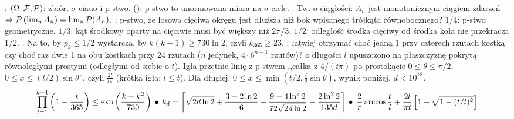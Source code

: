 :  $(\Omega, \mathcal F, \operatorname{\mathcal{P}})$: zbiór, $\sigma$-ciauo i p-stwo.
 (): p-stwo to unormowana miara na $\sigma$-ciele.
.
Tw. o ciągłości: $A_n$ jest monotonicznym ciągiem zdarzeń $\Rightarrow \operatorname{\mathcal{P}}\left(\lim_n A_n \right) = \lim_n \operatorname{\mathcal{P}}(A_n)$.
: p-stwo, że losowa cięciwa okręgu jest dłuższa niż bok wpisanego trójkąta równobocznego?
$1/4$: p-stwo geometryczne. 
$1/3$: kąt środkowy oparty na cięciwie musi być większy niż $2\pi/3$.
$1/2$: odległość środka cięciwy od środka koła nie przekracza $1/2$. 
.
Na to, by $p_k \le 1/2$ wystarcza, by $k(k-1) \ge 730\ln 2$, czyli $k_{365} \ge 23$.
: łatwiej otrzymać choć jedną 1 przy czterech rzutach kostką czy choć raz dwie 1 na obu kostkach przy 24 rzutach ($n$ jedynek, $4 \cdot 6^{n-1}$ rzutów)?
 o długości $l$ upuszczono na płaszczyznę pokrytą równoległymi prostymi (odległymi od siebie o $t$).
Igła przetnie linię z p-stwem ,,całka z $4/(t\pi)$ po prostokącie $0 \le \theta \le \pi/2$, $0 \le x \le (l/2) \sin \theta$'', czyli $\frac{2l}{t\pi}$ (krótka igła: $l \le t$).
Dla długiej: $0 \le x \le \min(t/2, \frac{l}{2} \sin \theta)$, wynik poniżej.
\hfill $d < 10^{18}$.
\[
	\prod_{t=1}^{k-1} \left(1-\frac{t}{365}\right) \le \exp\left(\frac{k-k^2}{730}\right) \, \bullet \,
	k_d = \left\lceil \sqrt{2d\ln 2}
	    + \frac{3-2\ln 2}{6}
	    + \frac{9-4\ln^2 2}{72\sqrt{2d\ln 2}}
	    - \frac{2\ln^2 2}{135d}\right\rceil \, \bullet \,
	\frac{2}{\pi} \arccos \frac{t}{l} + \frac{2l}{\pi t} \left[1-\sqrt{1-(t/l)^2}\right]
\]